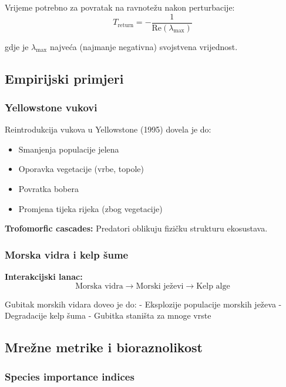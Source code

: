 \documentclass[11pt,oneside]{book}
\begin{document}
Vrijeme potrebno za povratak na ravnotežu nakon perturbacije:
\begin{equation}
	T_{\text{return}} = -\frac{1}{\text{Re}(\lambda_{\max})}
\end{equation}

gdje je $\lambda_{\max}$ najveća (najmanje negativna) svojstvena vrijednost.

\subsection{Empirijski primjeri}

\subsubsection{Yellowstone vukovi}

Reintrodukcija vukova u Yellowstone (1995) dovela je do:

\begin{itemize}
	\item Smanjenja populacije jelena
	\item Oporavka vegetacije (vrbe, topole)
	\item Povratka bobera
	\item Promjena tijeka rijeka (zbog vegetacije)
\end{itemize}

\textbf{Trofomorfic cascades:} Predatori oblikuju fizičku strukturu ekosustava.

\subsubsection{Morska vidra i kelp šume}

\textbf{Interakcijski lanac:}
\begin{equation}
	\text{Morska vidra} \to \text{Morski ježevi} \to \text{Kelp alge}
\end{equation}

Gubitak morskih vidara doveo je do:
- Eksplozije populacije morskih ježeva  
- Degradacije kelp šuma
- Gubitka staništa za mnoge vrste

\subsection{Mrežne metrike i bioraznolikost}

\subsubsection{Species importance indices}
\end{document}
